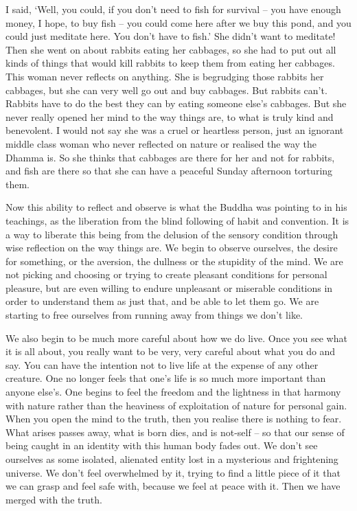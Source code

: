 I said, `Well, you could, if you don't need to fish for survival -- you have enough money, I hope, to buy fish -- you could come here after we buy this pond, and you could just meditate here. You don't have to fish.' She didn't want to meditate! Then she went on about rabbits eating her cabbages, so she had to put out all kinds of things that would kill rabbits to keep them from eating her cabbages. This woman never reflects on anything. She is begrudging those rabbits her cabbages, but she can very well go out and buy cabbages. But rabbits can't. Rabbits have to do the best they can by eating someone else's cabbages. But she never really opened her mind to the way things are, to what is truly kind and benevolent. I would not say she was a cruel or heartless person, just an ignorant middle class woman who never reflected on nature or realised the way the Dhamma is. So she thinks that cabbages are there for her and not for rabbits, and fish are there so that she can have a peaceful Sunday afternoon torturing them.

Now this ability to reflect and observe is what the Buddha was pointing to in his teachings, as the liberation from the blind following of habit and convention. It is a way to liberate this being from the delusion of the sensory condition through wise reflection on the way things are. We begin to observe ourselves, the desire for something, or the aversion, the dullness or the stupidity of the mind. We are not picking and choosing or trying to create pleasant conditions for personal pleasure, but are even willing to endure unpleasant or miserable conditions in order to understand them as just that, and be able to let them go. We are starting to free ourselves from running away from things we don't like.

We also begin to be much more careful about how we do live. Once you see what it is all about, you really want to be very, very careful about what you do and say. You can have the intention not to live life at the expense of any other creature. One no longer feels that one's life is so much more important than anyone else's. One begins to feel the freedom and the lightness in that harmony with nature rather than the heaviness of exploitation of nature for personal gain. When you open the mind to the truth, then you realise there is nothing to fear. What arises passes away, what is born dies, and is not-self -- so that our sense of being caught in an identity with this human body fades out. We don't see ourselves as some isolated, alienated entity lost in a mysterious and frightening universe. We don't feel overwhelmed by it, trying to find a little piece of it that we can grasp and feel safe with, because we feel at peace with it. Then we have merged with the truth.


